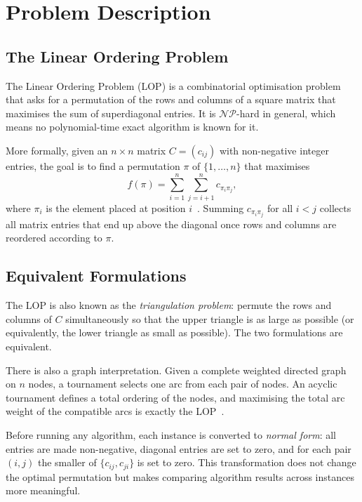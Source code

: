 \chapter{Problem Description}

\section{The Linear Ordering Problem}

The Linear Ordering Problem (LOP) is a combinatorial optimisation problem
that asks for a permutation of the rows and columns of a square matrix that
maximises the sum of superdiagonal entries. It is $\mathcal{NP}$-hard in
general, which means no polynomial-time exact algorithm is known for it.

More formally, given an $n \times n$ matrix $C = (c_{ij})$ with non-negative
integer entries, the goal is to find a permutation $\pi$ of $\{1, \ldots, n\}$
that maximises
\begin{equation}
    f(\pi) = \sum_{i=1}^{n} \sum_{j=i+1}^{n} c_{\pi_i \pi_j},
    \label{eq:lop_obj}
\end{equation}
where $\pi_i$ is the element placed at position $i$~\cite{SchStu04}. Summing
$c_{\pi_i \pi_j}$ for all $i < j$ collects all matrix entries that end up
above the diagonal once rows and columns are reordered according to $\pi$.

\section{Equivalent Formulations}

The LOP is also known as the \textit{triangulation problem}: permute the rows
and columns of $C$ simultaneously so that the upper triangle is as large as
possible (or equivalently, the lower triangle as small as possible). The two
formulations are equivalent.

There is also a graph interpretation. Given a complete weighted directed graph
on $n$ nodes, a tournament selects one arc from each pair of nodes. An acyclic
tournament defines a total ordering of the nodes, and maximising the total arc
weight of the compatible arcs is exactly the LOP~\cite{MarReiDua12}.

Before running any algorithm, each instance is converted to \textit{normal
form}: all entries are made non-negative, diagonal entries are set to zero,
and for each pair $(i, j)$ the smaller of $\{c_{ij}, c_{ji}\}$ is set to
zero. This transformation does not change the optimal permutation but makes
comparing algorithm results across instances more meaningful.

